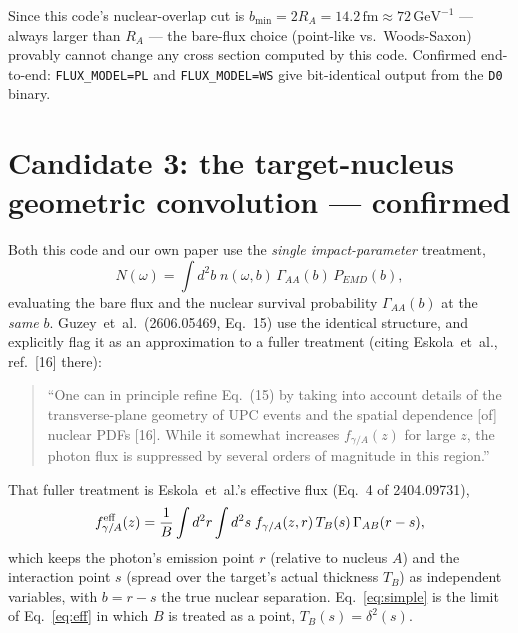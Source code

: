 \documentclass[11pt]{article}
\begin{document}
Since this code's nuclear-overlap cut is $b_{\min}=2R_A=14.2\,\text{fm}\approx
72\,\text{GeV}^{-1}$ --- always larger than $R_A$ --- the bare-flux
choice (point-like vs.\ Woods-Saxon) provably cannot change any cross
section computed by this code. Confirmed end-to-end: \texttt{FLUX\_MODEL=PL}
and \texttt{FLUX\_MODEL=WS} give bit-identical output from the \texttt{D0}
binary.

\section{Candidate 3: the target-nucleus geometric convolution --- confirmed}
\label{sec:eff}

Both this code and our own paper use the \emph{single impact-parameter}
treatment,
\begin{equation}
N(\omega)=\int d^2b\; n(\omega,b)\,\Gamma_{AA}(b)\,P_{EMD}(b),
\label{eq:simple}
\end{equation}
evaluating the bare flux and the nuclear survival probability
$\Gamma_{AA}(b)$ at the \emph{same} $b$. Guzey~et~al.\ (2606.05469, Eq.~15)
use the identical structure, and explicitly flag it as an approximation to
a fuller treatment (citing Eskola~et~al., ref.~[16] there):
\begin{quote}
``One can in principle refine Eq.~(15) by taking into account details of
the transverse-plane geometry of UPC events and the spatial dependence
[of] nuclear PDFs [16]. While it somewhat increases $f_{\gamma/A}(z)$ for
large $z$, the photon flux is suppressed by several orders of magnitude in
this region.''
\end{quote}
That fuller treatment is Eskola~et~al.'s effective flux (Eq.~4 of
2404.09731),
\begin{equation}
f_{\gamma/A}^{\rm eff}(z)=\frac{1}{B}\int d^2r\int d^2s\;
f_{\gamma/A}(z,r)\,T_B(s)\,\Gamma_{AB}(r-s),
\label{eq:eff}
\end{equation}
which keeps the photon's emission point $r$ (relative to nucleus $A$) and
the interaction point $s$ (spread over the target's actual thickness
$T_B$) as independent variables, with $b=r-s$ the true nuclear separation.
Eq.~\eqref{eq:simple} is the limit of Eq.~\eqref{eq:eff} in which $B$ is
treated as a point, $T_B(s)=\delta^2(s)$.
\end{document}
